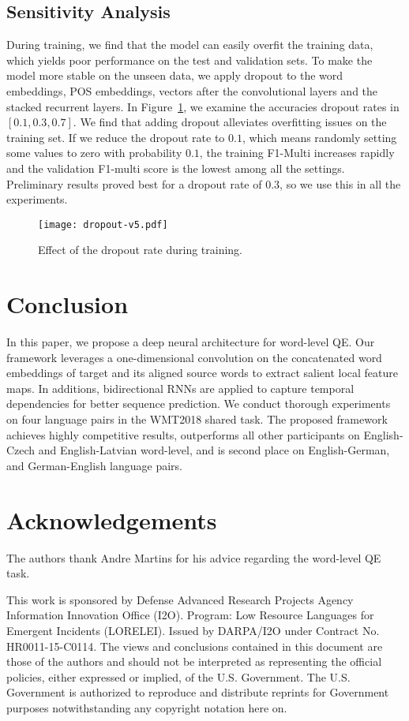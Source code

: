 \documentclass[11pt,a4paper]{article}
\begin{document}
\subsection{Sensitivity Analysis}
During training, we find that the model can easily overfit the training data, which yields poor performance on the test and validation sets. To make the model more stable on the unseen data, we apply dropout to the word embeddings, POS embeddings, vectors after the convolutional layers and the stacked recurrent layers. In Figure~\ref{fig:dropout}, we examine the accuracies dropout rates in $[0.1, 0.3, 0.7]$. We find that adding dropout alleviates overfitting issues on the training set. If we reduce the dropout rate to $0.1$, which means randomly setting some values to zero with probability $0.1$, the training F1-Multi increases rapidly and the validation F1-multi score is the lowest among all the settings. Preliminary results proved best for a dropout rate of $0.3$, so we use this in all the experiments.   
\begin{figure}
	\centering
    \texttt{[image: dropout-v5.pdf]}
	\caption{Effect of the dropout rate during training.} 
	\label{fig:dropout}
\end{figure}

\section{Conclusion}
In this paper, we propose a deep neural architecture for word-level QE.
Our framework leverages a one-dimensional convolution on the
concatenated word embeddings of target and its aligned source words to extract salient local feature maps.
In additions, bidirectional RNNs are applied to capture temporal dependencies for better sequence prediction.
We conduct thorough experiments on four language pairs in the WMT2018 shared task.
The proposed framework achieves highly competitive results, outperforms all other participants on English-Czech and English-Latvian word-level, and is
second place on English-German, and German-English language pairs.  

\section*{Acknowledgements}

The authors thank Andre Martins for his advice regarding the word-level QE task.

This work is sponsored by Defense Advanced Research Projects Agency Information Innovation Office (I2O). Program: Low Resource Languages for Emergent Incidents (LORELEI). Issued by DARPA/I2O under Contract No. HR0011-15-C0114. The views and conclusions contained in this document are those of the authors and should not be interpreted as representing the official policies, either expressed or implied, of the U.S. Government. The U.S. Government is authorized to reproduce and distribute reprints for Government purposes notwithstanding any copyright notation here on.



\end{document}
